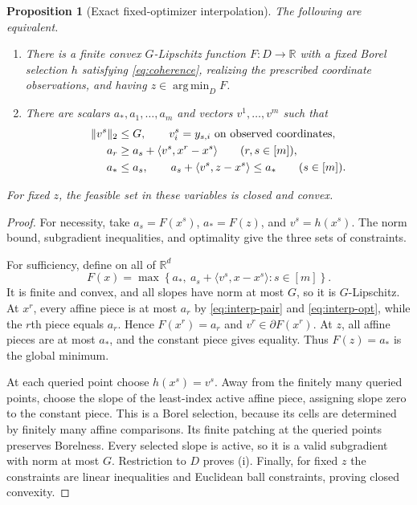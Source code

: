 \documentclass[11pt]{article}
\numberwithin{equation}{section}
\newtheorem{proposition}[proposition]{Proposition}
\theoremstyle{definition}
\theoremstyle{remark}
\newcommand{\R}{\mathbb R}
\DeclareMathOperator{\argmin}{arg\,min}
\DeclarePairedDelimiter{\norm}{\lVert}{\rVert}
\newcommand{\ip}[2]{\langle #1,#2\rangle}
\begin{document}
\begin{proposition}[Exact fixed-optimizer interpolation]\label{prop:interpolation}
The following are equivalent.
\begin{enumerate}[label=(\roman*)]
\item There is a finite convex $G$-Lipschitz function $F:D\to\R$ with a fixed Borel selection $h$ satisfying \eqref{eq:coherence}, realizing the prescribed coordinate observations, and having $z\in\argmin_DF$.
\item There are scalars $a_*,a_1,\ldots,a_m$ and vectors $v^1,\ldots,v^m$ such that
\begin{align}
\norm{v^s}_2&\le G,\qquad v_i^s=y_{s,i}\text{ on observed coordinates},\label{eq:interp-norm}\\
a_r&\ge a_s+\ip{v^s}{x^r-x^s}\qquad(r,s\in[m]),\label{eq:interp-pair}\\
a_*&\le a_s,\qquad a_s+\ip{v^s}{z-x^s}\le a_*
\qquad(s\in[m]).\label{eq:interp-opt}
\end{align}
\end{enumerate}
For fixed $z$, the feasible set in these variables is closed and convex.
\end{proposition}
\begin{proof}
For necessity, take $a_s=F(x^s)$, $a_*=F(z)$, and $v^s=h(x^s)$. The norm bound, subgradient inequalities, and optimality give the three sets of constraints.

For sufficiency, define on all of $\R^d$
\begin{equation}\label{eq:maxaffine-completion}
F(x)=\max\left\{a_*,\ a_s+\ip{v^s}{x-x^s}:s\in[m]\right\}.
\end{equation}
It is finite and convex, and all slopes have norm at most $G$, so it is $G$-Lipschitz. At $x^r$, every affine piece is at most $a_r$ by \eqref{eq:interp-pair} and \eqref{eq:interp-opt}, while the $r$th piece equals $a_r$. Hence $F(x^r)=a_r$ and $v^r\in\partial F(x^r)$. At $z$, all affine pieces are at most $a_*$, and the constant piece gives equality. Thus $F(z)=a_*$ is the global minimum.

At each queried point choose $h(x^s)=v^s$. Away from the finitely many queried points, choose the slope of the least-index active affine piece, assigning slope zero to the constant piece. This is a Borel selection, because its cells are determined by finitely many affine comparisons. Its finite patching at the queried points preserves Borelness. Every selected slope is active, so it is a valid subgradient with norm at most $G$. Restriction to $D$ proves (i). Finally, for fixed $z$ the constraints are linear inequalities and Euclidean ball constraints, proving closed convexity.
\end{proof}
\end{document}
